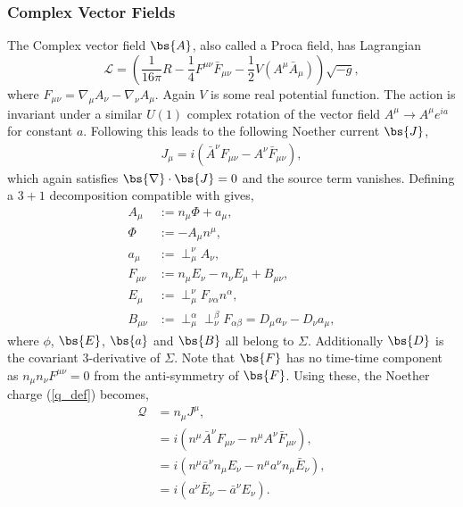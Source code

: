 \subsubsection{Complex Vector Fields} \label{sect:noether2}
The Complex vector field $\bs{A}$, also called a Proca field, has Lagrangian
\begin{equation}
\mathcal{L} = \left(\frac{1}{16 \pi }R -\frac{1}{4}F^{\mu\nu}\bar{F}_{\mu\nu} - \frac{1}{2}V(A^\mu \bar{A}_\mu) \right)\sqrt{-g},
\end{equation}
where $F_{\mu\nu} = \nabla_\mu A_\nu - \nabla_\nu A_\mu$. Again $V$ is some real potential function. The action is invariant under a similar $U(1)$ complex rotation of the vector field $A^\mu \rightarrow A^\mu e^{ia}$ for constant $a$. Following \cite{Minamitsuji_2018} this leads to the following Noether current $\bs{J}$,
\begin{align}
J_\mu = i\left(\bar{A}^\nu F_{\mu\nu} - A^\nu \bar{F}_{\mu\nu} \right),
\end{align} 
which again satisfies $\bs{\nabla}\cdot \bs{J} =0$ and the source term vanishes. Defining a $3+1$ decomposition compatible with \cite{Zilh_o_2015} gives,
\begin{align}
A_\mu &:= n_\mu \Phi + a_\mu, \\
\Phi &:= -A_\mu n^\mu, \\
a_\mu &:= \perp^\nu_\mu A_\nu, \\
F_{\mu\nu} &:= n_\mu E_\nu - n_\nu E_\mu + B_{\mu\nu}, \\
E_\mu &:= \perp^\nu_\mu F_{\nu\alpha}n^\alpha, \\
B_{\mu\nu} &:= \perp^\alpha_\mu \perp^\beta_\nu F_{\alpha\beta} = D_\mu a_\nu - D_\nu a_\mu,
\end{align}
where $\phi$, $\bs{E}$, $\bs{a}$ and $\bs{B}$ all belong to $\Sigma$. Additionally $\bs{D}$ is the covariant 3-derivative of $\Sigma$. Note that $\bs{F}$ has no time-time component as $n_\mu n_\nu F^{\mu\nu} =0$ from the anti-symmetry of $\bs{F}$. Using these, the Noether charge (\ref{q_def}) becomes,
\begin{align}
\mathcal{Q}&= n_\mu J^\mu, \\
           &=i\left( n^\mu \bar{A}^\nu F_{\mu\nu} - n^\mu A^\nu \bar{F}_{\mu\nu}  \right), \\
           &=i\left( n^\mu \bar{a}^\nu n_\mu E_\nu - n^\mu a^\nu n_\mu \bar{E}_{\nu}  \right), \\
           &=i\left( a^\nu \bar{E}_{\nu}  - \bar{a}^\nu E_\nu  \right).
\end{align}
